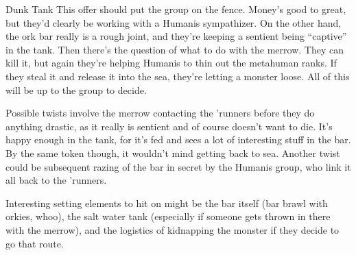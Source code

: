 \begin{scenario}{Dunk Tank}
\notes  This offer should put the group on the fence. Money's good to great, but they'd clearly be working with a Humanis sympathizer. On the other hand, the ork bar really is a rough joint, and they're keeping a sentient being ``captive'' in the tank. Then there's the question of what to do with the merrow. They can kill it, but again they're helping Humanis to thin out the metahuman ranks. If they steal it and release it into the sea, they're letting a monster loose. All of this will be up to the group to decide.

Possible twists involve the merrow contacting the 'runners before they do anything drastic, as it really is sentient and of course doesn't want to die. It's happy enough in the tank, for it's fed and sees a lot of interesting stuff in the bar. By the same token though, it wouldn't mind getting back to sea. Another twist could be subsequent razing of the bar in secret by the Humanis group, who link it all back to the 'runners.

Interesting setting elements to hit on might be the bar itself (bar brawl with orkies, whoo), the salt water tank (especially if someone gets thrown in there with the merrow), and the logistics of kidnapping the monster if they decide to go that route. 

\end{scenario}

